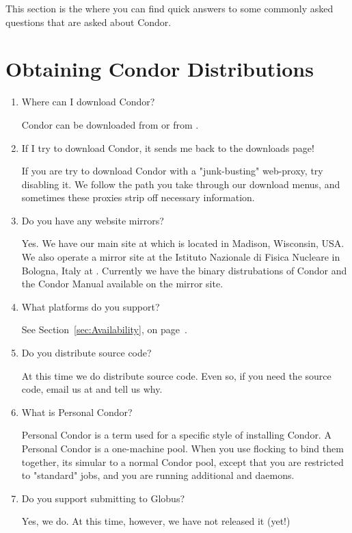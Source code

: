 This section is the where you can find quick answers to some commonly
asked questions that are asked about Condor.

\section{Obtaining Condor Distributions}

\begin{enumerate}
\item Where can I download Condor?

Condor can be downloaded from  or from
.

\item If I try to download Condor, it sends me back to the downloads page!

If you are try to download Condor with a "junk-busting" web-proxy, try disabling it.
We follow the path you take through our download menus, and sometimes these proxies strip off necessary information.

\item Do you have any website mirrors?

Yes.  We have our main site at 
which is located in Madison, Wisconsin, USA.  We also operate a mirror
site at the Istituto Nazionale di Fisica Nucleare in Bologna, Italy
at .  Currently we have the 
binary distrubations of Condor and the Condor Manual available on the
mirror site.

\item What platforms do you support?

See Section~\ref{sec:Availability}, on page~\pageref{sec:Availability}.

\item Do you distribute source code?

At this time we do  distribute source code.
Even so, if you need the source code, email us at  and tell us why.

\item What is Personal Condor?

Personal Condor is a term used for a specific style of installing Condor.
A Personal Condor is a one-machine pool.  When you use flocking to bind
them together, its simular to a normal Condor pool, except that you are restricted
to "standard" jobs, and you are running additional  and  
daemons.

\item Do you support submitting to Globus?

Yes, we do.  At this time, however, we have not released it (yet!)

\end{enumerate}



